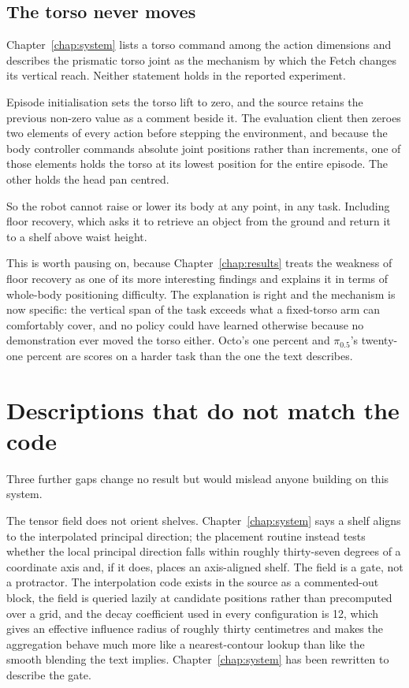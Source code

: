 \subsection*{The torso never moves}

Chapter~\ref{chap:system} lists a torso command among the action dimensions and describes the prismatic torso joint as the mechanism by which the Fetch changes its vertical reach. Neither statement holds in the reported experiment.

Episode initialisation sets the torso lift to zero, and the source retains the previous non-zero value as a comment beside it. The evaluation client then zeroes two elements of every action before stepping the environment, and because the body controller commands absolute joint positions rather than increments, one of those elements holds the torso at its lowest position for the entire episode. The other holds the head pan centred.

So the robot cannot raise or lower its body at any point, in any task. Including floor recovery, which asks it to retrieve an object from the ground and return it to a shelf above waist height.

This is worth pausing on, because Chapter~\ref{chap:results} treats the weakness of floor recovery as one of its more interesting findings and explains it in terms of whole-body positioning difficulty. The explanation is right and the mechanism is now specific: the vertical span of the task exceeds what a fixed-torso arm can comfortably cover, and no policy could have learned otherwise because no demonstration ever moved the torso either. Octo's one percent and $\pi_{0.5}$'s twenty-one percent are scores on a harder task than the one the text describes.

\section{Descriptions that do not match the code}

Three further gaps change no result but would mislead anyone building on this system.

The tensor field does not orient shelves. Chapter~\ref{chap:system} says a shelf aligns to the interpolated principal direction; the placement routine instead tests whether the local principal direction falls within roughly thirty-seven degrees of a coordinate axis and, if it does, places an axis-aligned shelf. The field is a gate, not a protractor. The interpolation code exists in the source as a commented-out block, the field is queried lazily at candidate positions rather than precomputed over a grid, and the decay coefficient used in every configuration is 12, which gives an effective influence radius of roughly thirty centimetres and makes the aggregation behave much more like a nearest-contour lookup than like the smooth blending the text implies. Chapter~\ref{chap:system} has been rewritten to describe the gate.

